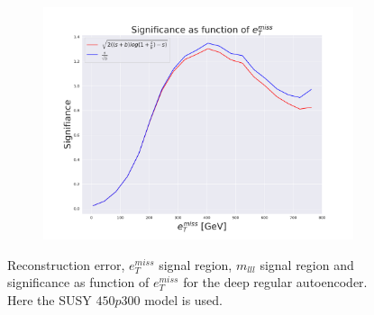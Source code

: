 \begin{figure}[H]
    \hfill  
    \begin{subfigure}{.40\textwidth}
        \includegraphics[width=\textwidth]{Figures/VAE_testing/small/2lep/significance_etmiss_450p0p0300_-0.6363602624727392.pdf}
        \caption{}
        \label{fig:VAE_2lep_small_signi_450_2}
    \end{subfigure}
    \hfill      
    \caption[2lep shallow network | $450p300$ | VAE | 2]{Reconstruction error, $e_T^{miss}$ signal region, $m_{lll}$ signal region and significance as function of 
    $e_T^{miss}$ for the deep regular autoencoder. Here the SUSY $450p300$ model is used.}
    \label{fig:VAE_2lep_small_rec_sig_signi_450_2}
\end{figure}


